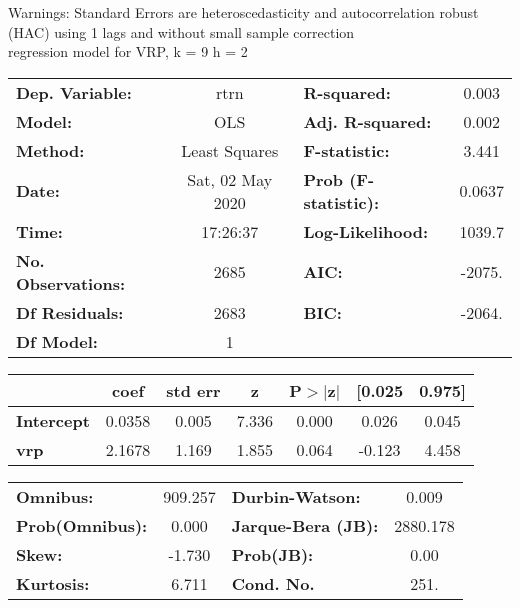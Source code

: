 Warnings: \newline
 [1] Standard Errors are heteroscedasticity and autocorrelation robust (HAC) using 1 lags and without small sample correction\\ 

regression model for VRP, k = 9 h = 2\begin{center}
\begin{tabular}{lclc}
\toprule
\textbf{Dep. Variable:}    &       rtrn       & \textbf{  R-squared:         } &     0.003   \\
\textbf{Model:}            &       OLS        & \textbf{  Adj. R-squared:    } &     0.002   \\
\textbf{Method:}           &  Least Squares   & \textbf{  F-statistic:       } &     3.441   \\
\textbf{Date:}             & Sat, 02 May 2020 & \textbf{  Prob (F-statistic):} &   0.0637    \\
\textbf{Time:}             &     17:26:37     & \textbf{  Log-Likelihood:    } &    1039.7   \\
\textbf{No. Observations:} &        2685      & \textbf{  AIC:               } &    -2075.   \\
\textbf{Df Residuals:}     &        2683      & \textbf{  BIC:               } &    -2064.   \\
\textbf{Df Model:}         &           1      & \textbf{                     } &             \\
\bottomrule
\end{tabular}
\begin{tabular}{lcccccc}
                   & \textbf{coef} & \textbf{std err} & \textbf{z} & \textbf{P$> |$z$|$} & \textbf{[0.025} & \textbf{0.975]}  \\
\midrule
\textbf{Intercept} &       0.0358  &        0.005     &     7.336  &         0.000        &        0.026    &        0.045     \\
\textbf{vrp}       &       2.1678  &        1.169     &     1.855  &         0.064        &       -0.123    &        4.458     \\
\bottomrule
\end{tabular}
\begin{tabular}{lclc}
\textbf{Omnibus:}       & 909.257 & \textbf{  Durbin-Watson:     } &    0.009  \\
\textbf{Prob(Omnibus):} &   0.000 & \textbf{  Jarque-Bera (JB):  } & 2880.178  \\
\textbf{Skew:}          &  -1.730 & \textbf{  Prob(JB):          } &     0.00  \\
\textbf{Kurtosis:}      &   6.711 & \textbf{  Cond. No.          } &     251.  \\
\bottomrule
\end{tabular}
\end{center}

